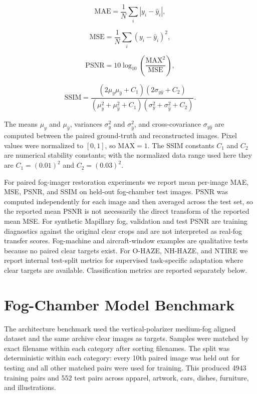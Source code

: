 \documentclass[9pt]{osa-supplemental-document}
\begin{document}
\begin{equation}
\mathrm{MAE} = \frac{1}{N} \sum_i \left| y_i - \hat{y}_i \right| ,
\label{eqS:mae}
\end{equation}

\begin{equation}
\mathrm{MSE} = \frac{1}{N} \sum_i \left( y_i - \hat{y}_i \right)^2 ,
\label{eqS:mse}
\end{equation}

\begin{equation}
\mathrm{PSNR} = 10 \log_{10} \left( \frac{\mathrm{MAX}^2}{\mathrm{MSE}} \right) ,
\label{eqS:psnr}
\end{equation}

\begin{equation}
\mathrm{SSIM} =
\frac{(2\mu_y \mu_{\hat{y}} + C_1)(2\sigma_{y\hat{y}} + C_2)}
{(\mu_y^2 + \mu_{\hat{y}}^2 + C_1)(\sigma_y^2 + \sigma_{\hat{y}}^2 + C_2)} .
\label{eqS:ssim}
\end{equation}

The means $\mu_y$ and $\mu_{\hat{y}}$, variances $\sigma_y^2$ and $\sigma_{\hat{y}}^2$, and cross-covariance $\sigma_{y\hat{y}}$ are computed between the paired ground-truth and reconstructed images. Pixel values were normalized to $[0,1]$, so $\mathrm{MAX}=1$. The SSIM constants $C_1$ and $C_2$ are numerical stability constants; with the normalized data range used here they are $C_1=(0.01)^2$ and $C_2=(0.03)^2$.

For paired fog-imager restoration experiments we report mean per-image MAE, MSE, PSNR, and SSIM on held-out fog-chamber test images. PSNR was computed independently for each image and then averaged across the test set, so the reported mean PSNR is not necessarily the direct transform of the reported mean MSE. For synthetic Mapillary fog, validation and test PSNR are training diagnostics against the original clear crops and are not interpreted as real-fog transfer scores. Fog-machine and aircraft-window examples are qualitative tests because no paired clear targets exist. For O-HAZE, NH-HAZE, and NTIRE we report internal test-split metrics for supervised task-specific adaptation where clear targets are available. Classification metrics are reported separately below.

\section{Fog-Chamber Model Benchmark}

The architecture benchmark used the vertical-polarizer medium-fog aligned dataset and the same archive clear images as targets. Samples were matched by exact filename within each category after sorting filenames. The split was deterministic within each category: every 10th paired image was held out for testing and all other matched pairs were used for training. This produced 4943 training pairs and 552 test pairs across apparel, artwork, cars, dishes, furniture, and illustrations.
\end{document}
